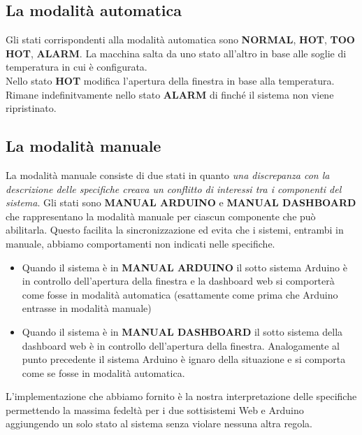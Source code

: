 \documentclass{report}
\begin{document}
\subsection{La modalità automatica}

\par{
Gli stati corrispondenti alla modalità automatica sono \textbf{NORMAL}, \textbf{HOT}, \textbf{TOO HOT}, \textbf{ALARM}. La macchina salta da uno stato all'altro in base alle soglie di temperatura in cui è configurata. \\
Nello stato \textbf{HOT} modifica l'apertura della finestra in base alla temperatura. \\
Rimane indefinitvamente nello stato \textbf{ALARM} di finché il sistema non viene ripristinato.
}
\subsection{La modalità manuale}
La modalità manuale consiste di due stati in quanto \textit{una discrepanza con la descrizione delle specifiche creava un conflitto di interessi tra i componenti del sistema}. 
Gli stati sono \textbf{MANUAL ARDUINO} e \textbf{MANUAL DASHBOARD} che rappresentano la modalità manuale per ciascun componente che può abilitarla. Questo facilita la sincronizzazione ed evita che i sistemi, entrambi in manuale, abbiamo comportamenti non indicati nelle specifiche. \\
\begin{itemize}
    \item Quando il sistema è in \textbf{MANUAL ARDUINO} il sotto sistema Arduino è in controllo dell'apertura della finestra e la dashboard web si comporterà come fosse in modalità automatica (esattamente come prima  che Arduino entrasse in modalità manuale)
    \item Quando il sistema è in \textbf{MANUAL DASHBOARD} il sotto sistema della dashboard web è in controllo dell'apertura della finestra. Analogamente al punto precedente il sistema Arduino è ignaro della situazione e si comporta come se fosse in modalità automatica. 
\end{itemize}
L'implementazione che abbiamo fornito è la nostra interpretazione delle specifiche permettendo la massima fedeltà per i due sottisistemi Web e Arduino aggiungendo un solo stato al sistema senza violare nessuna altra regola. 
%
%
\end{document}

